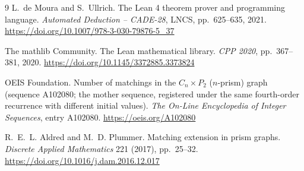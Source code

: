 \documentclass[11pt]{article}
\begin{document}
\begin{thebibliography}{9}
L.~de Moura and S.~Ullrich.
\newblock The Lean 4 theorem prover and programming language.
\newblock \emph{Automated Deduction -- CADE-28}, LNCS, pp.~625--635, 2021.
\url{https://doi.org/10.1007/978-3-030-79876-5_37}

The mathlib Community.
\newblock The Lean mathematical library.
\newblock \emph{CPP 2020}, pp.~367--381, 2020.
\url{https://doi.org/10.1145/3372885.3373824}

OEIS Foundation.
\newblock Number of matchings in the $C_n \times P_2$ ($n$-prism) graph
(sequence A102080; the mother sequence, registered under the same fourth-order
recurrence with different initial values).
\newblock \emph{The On-Line Encyclopedia of Integer Sequences}, entry
A102080.
\url{https://oeis.org/A102080}

R.~E.~L. Aldred and M.~D. Plummer.
\newblock Matching extension in prism graphs.
\newblock \emph{Discrete Applied Mathematics} 221 (2017), pp.~25--32.
\url{https://doi.org/10.1016/j.dam.2016.12.017}
\end{thebibliography}
\end{document}
